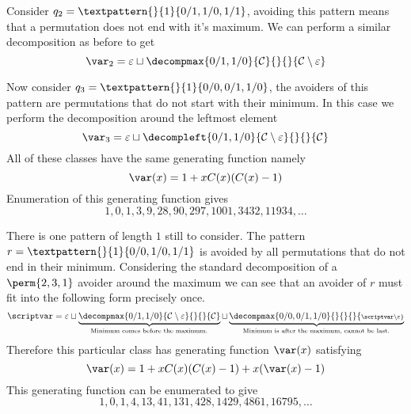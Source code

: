 Consider \(q_2 = \textpattern{}{1}{0/1,1/0,1/1}\), avoiding this pattern
means that a permutation does not end with it's maximum. We can perform a similar
decomposition as before to get
\begin{equation*}
    \mathcal{\var}_2 =\varepsilon \sqcup \decompmax{0/1,1/0}{\mathcal{C}}{}{}{\mathcal{C}\setminus\varepsilon}
\end{equation*}

Now consider \(q_3 = \textpattern{}{1}{0/0,0/1,1/0}\), the avoiders of this
pattern are permutations that do not start with their minimum. In this case we
perform the decomposition around the leftmost element
\begin{equation*}
    \mathcal{\var}_3 =\varepsilon \sqcup \decompleft{0/1,1/0}{\mathcal{C}\setminus\varepsilon}{}{}{\mathcal{C}}
\end{equation*}
All of these classes have the same generating function namely
\begin{equation*}
    \var(x) = 1 + xC(x)(C(x)-1)
\end{equation*}
Enumeration of this generating function gives
\begin{equation*}
    1, 0, 1, 3, 9, 28, 90, 297, 1001, 3432, 11934,\dotsc
\end{equation*}

\nextvar[\varmaxl]
There is one pattern of length \(1\) still to consider. The pattern
\(r = \textpattern{}{1}{0/0,1/0,1/1}\) is avoided by all permutations
that do not end in their minimum. Considering the standard decomposition
of a \(\perm{2,3,1}\) avoider around the maximum we can see that an avoider
of \(r\) must fit into the following form precisely once.
\begin{equation*}
    \scriptvar = \varepsilon \sqcup
    \underbrace{\decompmax{0/1,1/0}{\mathcal{C}\setminus\varepsilon}{}{}{\mathcal{C}}}_\text{
        Minimum comes before the maximum.
    } \sqcup
    \underbrace{\decompmax{0/0,0/1,1/0}{}{}{}{\scriptstyle{\scriptvar\setminus\varepsilon}}}_\text{
        Minimum is after the maximum, cannot be last.
    }
\end{equation*}
Therefore this particular class has generating function \(\var(x)\) satisfying
\begin{equation*}
    \var(x) = 1 + xC(x)(C(x)-1) + x(\var(x)-1)
\end{equation*}
This generating function can be enumerated to give
\begin{equation*}
    	1, 0, 1, 4, 13, 41, 131, 428, 1429, 4861, 16795,\dotsc
\end{equation*}

